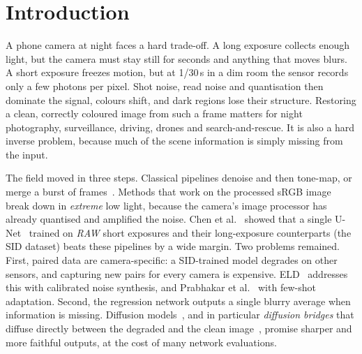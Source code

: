 \section{Introduction}
\label{sec:intro}

A phone camera at night faces a hard trade-off. A long exposure collects enough light, but the camera must stay still for seconds and anything that moves blurs. A short exposure freezes motion, but at 1/30\,s in a dim room the sensor records only a few photons per pixel. Shot noise, read noise and quantisation then dominate the signal, colours shift, and dark regions lose their structure. Restoring a clean, correctly coloured image from such a frame matters for night photography, surveillance, driving, drones and search-and-rescue. It is also a hard inverse problem, because much of the scene information is simply missing from the input.

The field moved in three steps. Classical pipelines denoise and then tone-map, or merge a burst of frames~\cite{dabov2007bm3d,hasinoff2016burst}. Methods that work on the processed sRGB image~\cite{wei2018retinexnet,guo2020zerodce,jiang2021enlightengan} break down in \emph{extreme} low light, because the camera's image processor has already quantised and amplified the noise. Chen et al.~\cite{chen2018sid} showed that a single U-Net~\cite{ronneberger2015unet} trained on \emph{RAW} short exposures and their long-exposure counterparts (the SID dataset) beats these pipelines by a wide margin. Two problems remained. First, paired data are camera-specific: a SID-trained model degrades on other sensors, and capturing new pairs for every camera is expensive. ELD~\cite{wei2020eld} addresses this with calibrated noise synthesis, and Prabhakar et al.~\cite{prabhakar2021fewshot} with few-shot adaptation. Second, the regression network outputs a single blurry average when information is missing. Diffusion models~\cite{ho2020ddpm,saharia2022sr3}, and in particular \emph{diffusion bridges} that diffuse directly between the degraded and the clean image~\cite{liu2023i2sb,zhou2024ddbm}, promise sharper and more faithful outputs, at the cost of many network evaluations.

